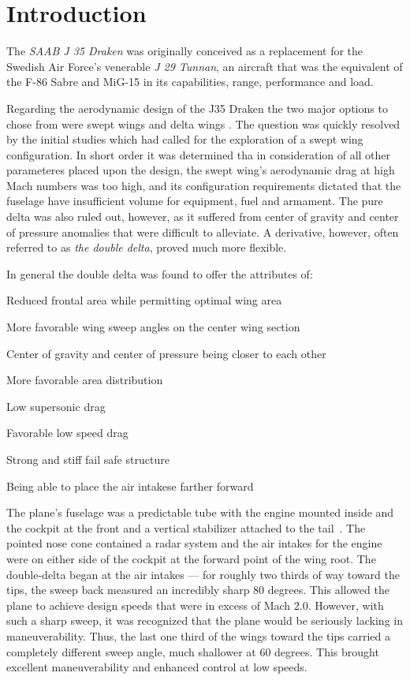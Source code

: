 \section{Introduction}

The \textit{SAAB J 35 Draken} was originally conceived as a replacement for the Swedish
Air Force’s venerable \textit{J 29 Tunnan}, an aircraft that was the equivalent of the
F-86 Sabre and MiG-15 in its capabilities, range, performance and load.

Regarding the aerodynamic design of the J35 Draken the two major options
to chose from were swept wings and delta wings \cite{dorr_aerofax_1987}.
The question was quickly resolved by the initial studies which had called
for the exploration of a swept wing configuration. In short order it  was
determined tha in consideration of all other parameteres placed upon the
design, the swept wing's aerodynamic drag at high Mach numbers was too high,
and its configuration requirements dictated that the fuselage have
insufficient volume for equipment, fuel and armament. The pure delta was
also ruled out, however, as it suffered from center of gravity and center of
pressure anomalies that were difficult to alleviate.  A derivative, however,
often referred to as \textit{the double delta}, proved much more flexible.

In general the double delta was found to offer the attributes of:
\begin{itemize*}
    \item Reduced frontal area while permitting optimal wing area
    \item More favorable wing sweep angles on the center wing section
    \item Center of gravity and center of pressure being closer to each other
    \item More favorable area distribution
    \item Low supersonic drag
    \item Favorable low speed drag
    \item Strong and stiff fail safe structure
    \item Being able to place the air intakese farther forward
\end{itemize*}

The plane’s fuselage was a  predictable tube with the engine mounted inside and
the cockpit at the front and a vertical stabilizer attached to the
tail~\cite{riseofDraken}.  The
pointed nose cone contained a radar system and the air intakes for the engine
were on either side of the cockpit at the forward point of the wing root.  The
double-delta began at the air intakes — for roughly two thirds of way toward the
tips, the sweep back measured an incredibly sharp 80 degrees.  This allowed the
plane to achieve design speeds that were in excess of Mach 2.0.  However, with
such a sharp sweep, it was recognized that the plane would be seriously lacking
in maneuverability.  Thus, the last one third of the wings toward the tips
carried a completely different sweep angle, much shallower at 60 degrees.  This
brought excellent maneuverability and enhanced control at low speeds.
